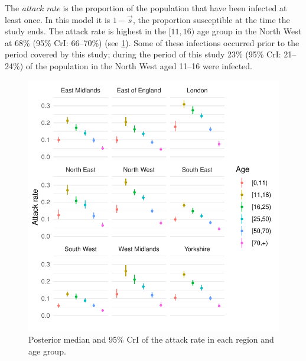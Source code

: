 \documentclass[thesis.tex]{subfiles}
\begin{document}
The \emph{attack rate} is the proportion of the population that have been infected at least once.
In this model it is $1 - \vec{s}$, the proportion susceptible at the time the study ends.
The attack rate is highest in the $[11, 16)$ age group in the North West at 68\% (95\% CrI: 66--70\%) (see \cref{SEIR:fig:attack-rates}).
Some of these infections occurred prior to the period covered by this study; during the period of this study 23\% (95\% CrI: 21--24\%) of the population in the North West aged 11--16 were infected.
\begin{figure}
    \includegraphics{SEIR/CIS/attack_rates}
    \caption{Posterior median and 95\% CrI of the attack rate in each region and age group.}
    \label{SEIR:fig:attack-rates}
\end{figure}
\end{document}
